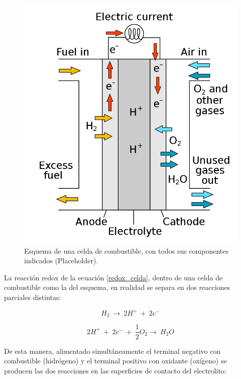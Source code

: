 \begin{figure}[h]
    \centering
    \includegraphics[scale=0.35]{Imagenes/Fuel Cell.png}
    \caption{Esquema de una celda de combustible, con todos sus componentes indicados (Placeholder).}
    \label{fuel_cell}
\end{figure}

La reacción redox de la ecuación \ref{redox_celda}, dentro de una celda de combustible como la del esquema, en realidad se separa en dos reacciones parciales distintas:

\begin{equation}\label{redox_anodo}
    H_2\ \longrightarrow\ 2H^{+}\ +\ 2e^-
\end{equation}

\begin{equation}\label{redox_catodo}
    2H^{+}\ +\ 2e^-\ +\ \frac{1}{2}O_2\longrightarrow\ H_2O
\end{equation}

De esta manera, alimentado simultáneamente el terminal negativo con combustible (hidrógeno) y el terminal positivo con oxidante (oxígeno) se producen las dos reacciones en las superficies de contacto del electrolito:


